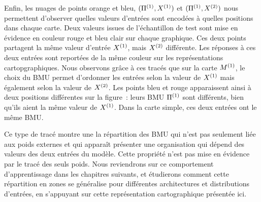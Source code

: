 \documentclass[../main]{subfiles}
\begin{document}
Enfin, les nuages de points orange et bleu, $(\Pi^{({1})},X^{({1})})$ et $(\Pi^{({1})},X^{({2})})$ nous permettent d'observer quelles valeurs d'entrées sont encodées à quelles positions dans chaque carte.
Deux valeurs issues de l'échantillon de test sont mise en évidence en couleur rouge et bleu clair sur chaque graphique.
Ces deux points partagent la même valeur d'entrée $X^{({1})}$, mais $X^{({2})}$ différente. Les réponses à ces deux entrées sont reportées de la même couleur sur les représentations cartopgraphiques.
Nous observons grâce à ces tracés que sur la carte $M^{({1})}$, le choix du BMU permet d'ordonner les entrées selon la valeur de $X^{({1})}$ mais également selon la valeur de $X^{({2})}$. 
Les points bleu et rouge apparaissent ainsi  à deux positions différentes sur la figure~: leurs BMU $\Pi^{({1})}$ sont différents, bien qu'ils aient la même valeur de $X^{({1})}$. 
Dans la carte simple, ces deux entrées ont le même BMU.


Ce type de tracé montre une la répartition des BMU qui n'est pas seulement liée aux poids externes et qui apparaît présenter une organisation qui dépend des valeurs des deux entrées du modèle.
Cette propriété n'est pas mise en évidence par le tracé des seuls poids.
Nous reviendrons sur ce comportement d'apprentissage dans les chapitres suivants, et étudierons comment cette répartition en zones se généralise pour différentes architectures et distributions d'entrées, en s'appuyant sur cette représentation cartographique présentée ici.
\end{document}

